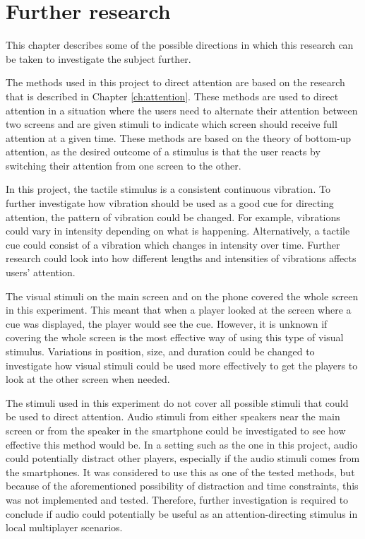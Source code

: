 \chapter{Further research}\label{sec:future_research}
This chapter describes some of the possible directions in which this research can be taken to investigate the subject further. 

The methods used in this project to direct attention are based on the research that is described in Chapter \ref{ch:attention}. These methods are used to direct attention in a situation where the users need to alternate their attention between two screens and are given stimuli to indicate which screen should receive full attention at a given time. These methods are based on the theory of bottom-up attention, as the desired outcome of a stimulus is that the user reacts by switching their attention from one screen to the other.

In this project, the tactile stimulus is a consistent continuous vibration. To further investigate how vibration should be used as a good cue for directing attention, the pattern of vibration could be changed. For example, vibrations could vary in intensity depending on what is happening. Alternatively, a tactile cue could consist of a vibration which changes in intensity over time. Further research could look into how different lengths and intensities of vibrations affects users' attention.

The visual stimuli on the main screen and on the phone covered the whole screen in this experiment. This meant that when a player looked at the screen where a cue was displayed, the player would see the cue. However, it is unknown if covering the whole screen is the most effective way of using this type of visual stimulus. Variations in position, size, and duration could be changed to investigate how visual stimuli could be used more effectively to get the players to look at the other screen when needed.

The stimuli used in this experiment do not cover all possible stimuli that could be used to direct attention. Audio stimuli from either speakers near the main screen or from the speaker in the smartphone could be investigated to see how effective this method would be. In a setting such as the one in this project, audio could potentially distract other players, especially if the audio stimuli comes from the smartphones. It was considered to use this as one of the tested methods, but because of the aforementioned possibility of distraction and time constraints, this was not implemented and tested. Therefore, further investigation is required to conclude if audio could potentially be useful as an attention-directing stimulus in local multiplayer scenarios.

